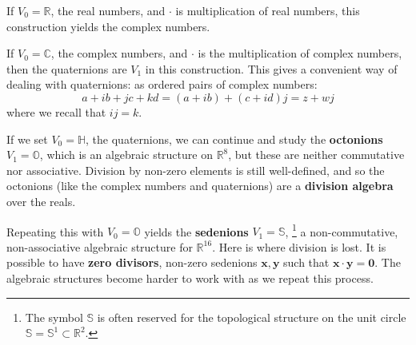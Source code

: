 \documentclass{article}
\theoremstyle{plain}
\theoremstyle{normal}
\begin{document}
            If $V_{0}=\mathbb{R}$, the real numbers,
            and $\cdot$ is multiplication of real numbers,
            this construction yields the complex numbers.
            \par\hfill\par
            If $V_{0}=\mathbb{C}$, the complex numbers,
            and $\cdot$ is the multiplication of
            complex numbers, then the quaternions are $V_{1}$ in this
            construction. This gives a convenient way of dealing with
            quaternions: as ordered pairs of complex numbers:
            \begin{equation}
                a+ib+jc+kd
                =(a+ib)+(c+id)j
                =z+wj
            \end{equation}
            where we recall that $ij=k$.
            \par\hfill\par
            If we set $V_{0}=\mathbb{H}$, the quaternions,
            we can continue and study the
            \textbf{octonions} $V_{1}=\mathbb{O}$, which is an
            algebraic structure on $\mathbb{R}^{8}$, but these are
            neither commutative nor associative. Division by non-zero elements
            is still well-defined, and so the octonions (like the complex
            numbers and quaternions) are a \textbf{division algebra}
            over the reals.
            \par\hfill\par
            Repeating this with $V_{0}=\mathbb{O}$ yields the \textbf{sedenions}
            $V_{1}=\mathbb{S}$,%
            \footnote{
                The symbol $\mathbb{S}$ is often reserved for the topological
                structure on the unit circle
                $\mathbb{S}=\mathbb{S}^{1}\subset\mathbb{R}^{2}$.
            }
            a non-commutative, non-associative algebraic
            structure for $\mathbb{R}^{16}$. Here is where division is lost.
            It is possible to have \textbf{zero divisors}, non-zero sedenions
            $\mathbf{x},\mathbf{y}$ such that
            $\mathbf{x}\cdot\mathbf{y}=\mathbf{0}$. The algebraic structures
            become harder to work with as we repeat this process.
\end{document}
